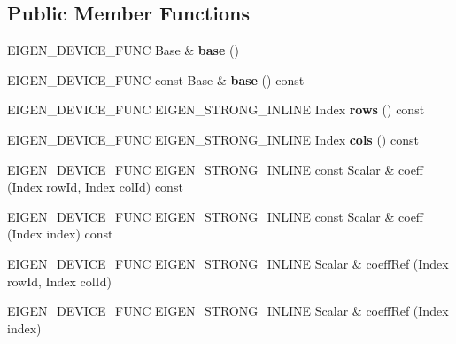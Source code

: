 \subsection*{Public Member Functions}
\begin{DoxyCompactItemize}
\item 
\mbox{\label{class_eigen_1_1_plain_object_base_a322485a0bc534ee24b8ce5c0df68ab50}} 
E\+I\+G\+E\+N\+\_\+\+D\+E\+V\+I\+C\+E\+\_\+\+F\+U\+NC Base \& {\bfseries base} ()
\item 
\mbox{\label{class_eigen_1_1_plain_object_base_a323e8a05899b309009eab82a52d21e86}} 
E\+I\+G\+E\+N\+\_\+\+D\+E\+V\+I\+C\+E\+\_\+\+F\+U\+NC const Base \& {\bfseries base} () const
\item 
\mbox{\label{class_eigen_1_1_plain_object_base_aba7a925ce36c08ba2a08c90086f34718}} 
E\+I\+G\+E\+N\+\_\+\+D\+E\+V\+I\+C\+E\+\_\+\+F\+U\+NC E\+I\+G\+E\+N\+\_\+\+S\+T\+R\+O\+N\+G\+\_\+\+I\+N\+L\+I\+NE Index {\bfseries rows} () const
\item 
\mbox{\label{class_eigen_1_1_plain_object_base_a10b8b33b7587da564415561aa246f78f}} 
E\+I\+G\+E\+N\+\_\+\+D\+E\+V\+I\+C\+E\+\_\+\+F\+U\+NC E\+I\+G\+E\+N\+\_\+\+S\+T\+R\+O\+N\+G\+\_\+\+I\+N\+L\+I\+NE Index {\bfseries cols} () const
\item 
E\+I\+G\+E\+N\+\_\+\+D\+E\+V\+I\+C\+E\+\_\+\+F\+U\+NC E\+I\+G\+E\+N\+\_\+\+S\+T\+R\+O\+N\+G\+\_\+\+I\+N\+L\+I\+NE const Scalar \& \mbox{\hyperlink{class_eigen_1_1_plain_object_base_afbfc12954f16d21aedb7bd839f64a278}{coeff}} (Index row\+Id, Index col\+Id) const
\item 
E\+I\+G\+E\+N\+\_\+\+D\+E\+V\+I\+C\+E\+\_\+\+F\+U\+NC E\+I\+G\+E\+N\+\_\+\+S\+T\+R\+O\+N\+G\+\_\+\+I\+N\+L\+I\+NE const Scalar \& \mbox{\hyperlink{class_eigen_1_1_plain_object_base_af592e3993ea3d4ac9f073b42db2c04cc}{coeff}} (Index index) const
\item 
E\+I\+G\+E\+N\+\_\+\+D\+E\+V\+I\+C\+E\+\_\+\+F\+U\+NC E\+I\+G\+E\+N\+\_\+\+S\+T\+R\+O\+N\+G\+\_\+\+I\+N\+L\+I\+NE Scalar \& \mbox{\hyperlink{class_eigen_1_1_plain_object_base_a25626a55b26a4323565f79d1b7c48ea8}{coeff\+Ref}} (Index row\+Id, Index col\+Id)
\item 
E\+I\+G\+E\+N\+\_\+\+D\+E\+V\+I\+C\+E\+\_\+\+F\+U\+NC E\+I\+G\+E\+N\+\_\+\+S\+T\+R\+O\+N\+G\+\_\+\+I\+N\+L\+I\+NE Scalar \& \mbox{\hyperlink{class_eigen_1_1_plain_object_base_a571632ed666076d7403c8bd3eece44f0}{coeff\+Ref}} (Index index)

\end{DoxyCompactItemize}
